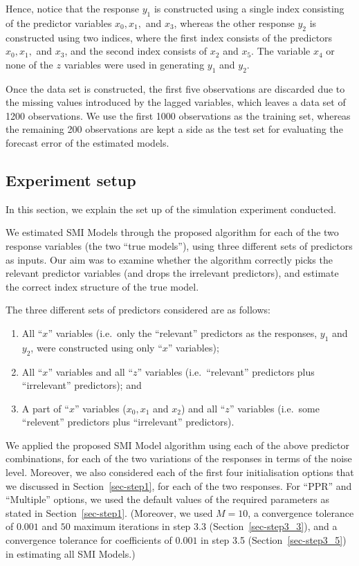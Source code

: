 \documentclass[11pt,a4paper,]{article}
\begin{document}
Hence, notice that the response \(y_{1}\) is constructed using a single
index consisting of the predictor variables \(x_{0}, x_{1},\) and
\(x_{3}\), whereas the other response \(y_{2}\) is constructed using two
indices, where the first index consists of the predictors
\(x_{0}, x_{1},\) and \(x_{3}\), and the second index consists of
\(x_{2}\) and \(x_{5}\). The variable \(x_{4}\) or none of the \(z\)
variables were used in generating \(y_{1}\) and \(y_{2}\).

Once the data set is constructed, the first five observations are
discarded due to the missing values introduced by the lagged variables,
which leaves a data set of 1200 observations. We use the first 1000
observations as the training set, whereas the remaining 200 observations
are kept a side as the test set for evaluating the forecast error of the
estimated models.

\hypertarget{sec-exp}{%
\subsection{Experiment setup}\label{sec-exp}}

In this section, we explain the set up of the simulation experiment
conducted.

We estimated SMI Models through the proposed algorithm for each of the
two response variables (the two ``true models''), using three different
sets of predictors as inputs. Our aim was to examine whether the
algorithm correctly picks the relevant predictor variables (and drops
the irrelevant predictors), and estimate the correct index structure of
the true model.

The three different sets of predictors considered are as follows:

\begin{enumerate}
\def\labelenumi{\arabic{enumi}.}
\item
  All ``\(x\)'' variables (i.e.~only the ``relevant'' predictors as the
  responses, \(y_{1}\) and \(y_{2}\), were constructed using only
  ``\(x\)'' variables);
\item
  All ``\(x\)'' variables and all ``\(z\)'' variables (i.e.~``relevant''
  predictors plus ``irrelevant'' predictors); and
\item
  A part of ``\(x\)'' variables (\(x_{0}, x_{1}\) and \(x_{2}\)) and all
  ``\(z\)'' variables (i.e.~some ``relevent'' predictors plus
  ``irrelevant'' predictors).
\end{enumerate}

We applied the proposed SMI Model algorithm using each of the above
predictor combinations, for each of the two variations of the responses
in terms of the noise level. Moreover, we also considered each of the
first four initialisation options that we discussed in
Section~\ref{sec-step1}, for each of the two responses. For ``PPR'' and
``Multiple'' options, we used the default values of the required
parameters as stated in Section~\ref{sec-step1}. (Moreover, we used
\(M = 10\), a convergence tolerance of \(0.001\) and \(50\) maximum
iterations in step 3.3 (Section~\ref{sec-step3_3}), and a convergence
tolerance for coefficients of \(0.001\) in step 3.5
(Section~\ref{sec-step3_5}) in estimating all SMI Models.)
\end{document}
